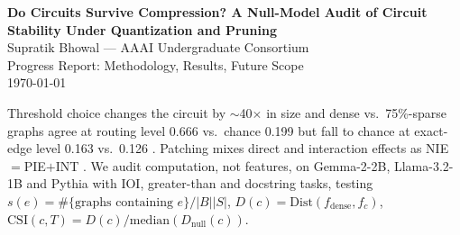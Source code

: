 \documentclass[11pt,a4paper]{article}
\makeatletter
\renewcommand\section{\@startsection{section}{1}{\z@}{-1.6ex plus -.5ex}{0.7ex plus .2ex}{\normalfont\large\bfseries}}
\makeatother
\begin{document}
\begin{center}
{\Large\bfseries Do Circuits Survive Compression? A Null-Model Audit of Circuit Stability Under Quantization and Pruning}\\[2pt]
{\normalsize Supratik Bhowal --- AAAI Undergraduate Consortium}\\[2pt]
{\small Progress Report: Methodology, Results, Future Scope}\\[2pt]
{\small \today}
\end{center}
\begin{abstract}\noindent Interpretability has measured representations under compression but not computation itself, and the one prior circuit claim is qualitative with no noise floor. We built a null-first Algorithm-1 pipeline with Circuit Stability Index (CSI), two-level comparison, and freeze-as-preregistration, validated end-to-end on synthetic tasks with 459 tests passed and 1 skipped and frozen null still false. Reproduced baselines show dense perplexity 8.21 for Gemma-2-2B and 9.28 for Llama-3.2-1B, Wanda over magnitude 0.794 vs.\ 0.210 at 30\% sparsity, and fixed-dictionary Jaccard correlation $-0.975$ with output damage; synthetic check gives CSI 0.333 [0.25,0.40]. No causal confirmation yet: CSI $\approx 1$ will mean noise, CSI $\gg 1$ selective damage, CSI $< 1$ gentler than noise.
\end{abstract}
\section{Introduction}
Threshold choice changes the circuit by $\sim$40$\times$ in size and dense vs.\ 75\%-sparse graphs agree at routing level 0.666 vs.\ chance 0.199 but fall to chance at exact-edge level 0.163 vs.\ 0.126 \cite{parekh2026circus,sheng2026circuit}. Patching mixes direct and interaction effects as NIE$=$PIE$+$INT \cite{vaidyanathan2026curse}. We audit computation, not features, on Gemma-2-2B, Llama-3.2-1B and Pythia with IOI, greater-than and docstring tasks, testing $\displaystyle s(e)=\#\{\text{graphs containing }e\}/|B||S|$, $D(c)=\mathrm{Dist}(f_{\mathrm{dense}},f_{c})$, $\mathrm{CSI}(c,T)=D(c)/\mathrm{median}(D_{\mathrm{null}}(c))$.
\end{document}
